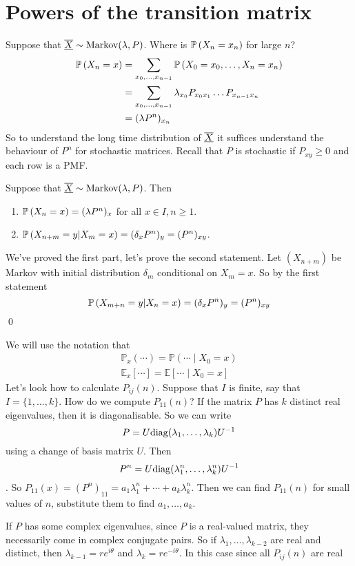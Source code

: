 \documentclass{article}
\begin{document}
\section{Powers of the transition matrix}
Suppose that $ \underline{\overline{X}}\sim\text{Markov}(\lambda, P) $. Where is $ \mathbb{P}\left({X_n=x_n}\right) $ for large $ n $?
\begin{align*}
	\mathbb{P}\left({X_n=x}\right)&=\sum_{x_0,\dots, x_{n-1}}\mathbb{P}\left({X_0=x_0,\dots, X_n=x_n}\right) \\ &= \sum_{x_0,\dots, x_{n-1}}\lambda_{x_0}P_{x_0x_1}\dots P_{x_{n-1}x_n} \\
		    &= (\lambda P^n)_{x_n}
\end{align*}
So to understand the long time distribution of $ \underline{\overline{X}} $ it suffices understand the behaviour of $ P^n $ for stochastic matrices. Recall that $ P $ is stochastic if $ P_{xy}\ge 0  $ and each row is a PMF.
\begin{theorem}
Suppose that $ \underline{\overline{X}}\sim\text{Markov}(\lambda, P) $. Then 
\begin{enumerate}
	\item $ \mathbb{P}\left({X_n=x}\right)=(\lambda P^n)_x $ for all $ x\in I, n \ge1 $.
	\item $ \mathbb{P}\left({X_{n+m}=y | X_m=x}\right)=(\delta_xP^n)_y=(P^n)_{xy} $.
\end{enumerate}
\end{theorem}
\pf We've proved the first part, let's prove the second statement. Let $ (X_{n+m}) $ be Markov with initial distribution $ \delta_m $ conditional on $ X_m=x $. So by the first statement
\[
	\mathbb{P}\left({X_{m+n}=y|X_n=x}\right)=(\delta_x P^n)_y=(P^n)_{xy}
\]\qed
\par
We will use the notation that
\begin{align*}
	\mathbb P_x(\cdots)=\mathbb P(\cdots \mid X_0=x)\\
	\mathbb E_x[\cdots]=\mathbb E[\cdots \mid X_0=x]
\end{align*}
Let's look how to calculate $ P_{ij}(n) $. Suppose that $ I $ is finite, say that $ I=\{1,\dots, k\} $. How do we compute $ P_{11}(n) $? If the matrix $ P $ has $ k $ distinct real eigenvalues, then it is diagonalisable. So we can write
\[
	P=U\mathrm{diag}(\lambda_1,\dots,\lambda_k){U}^{-1}
\]
using a change of basis matrix $ U $. Then
\[
	P^n=U\mathrm{diag}(\lambda_1^n,\dots, \lambda_k^n){U}^{-1}
\].
So $ P_{11}(x)=(P^n)_{11}=a_1\lambda_1^n+\cdots+a_k\lambda_k^n $. Then we can find $ P_{11}(n) $ for small values of $ n $, substitute them to find $ a_1,\dots, a_k $.\par
If $ P $ has some complex eigenvalues, since $ P $ is a real-valued matrix, they necessarily come in complex conjugate pairs. So if $ \lambda_1,\dots, \lambda_{k-2} $ are real and distinct, then $ \lambda_{k-1}=re^{i\theta} $ and $ \lambda_k=re^{-i\theta} $. In this case since all $ P_{ij}(n) $ are real
\end{document}
